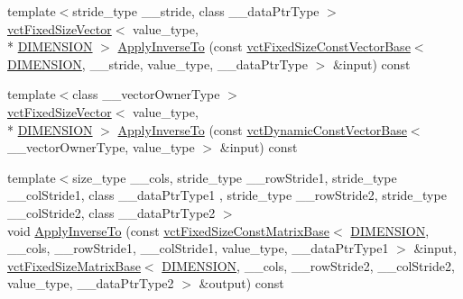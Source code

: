 \begin{DoxyCompactItemize}
\item 
{\footnotesize template$<$stride\-\_\-type \-\_\-\-\_\-stride, class \-\_\-\-\_\-data\-Ptr\-Type $>$ }\\\hyperlink{classvct_fixed_size_vector}{vct\-Fixed\-Size\-Vector}$<$ value\-\_\-type, \\*
\hyperlink{classvct_quaternion_rotation3_base_a729ac03acdd5949ecf382629e563d2a0a9417132a8a6849e18439d903ae6a1f18}{D\-I\-M\-E\-N\-S\-I\-O\-N} $>$ \hyperlink{classvct_quaternion_rotation3_base_a0b8f96ed4e769aab1d14769de116bf2b}{Apply\-Inverse\-To} (const \hyperlink{classvct_fixed_size_const_vector_base}{vct\-Fixed\-Size\-Const\-Vector\-Base}$<$ \hyperlink{classvct_quaternion_rotation3_base_a729ac03acdd5949ecf382629e563d2a0a9417132a8a6849e18439d903ae6a1f18}{D\-I\-M\-E\-N\-S\-I\-O\-N}, \-\_\-\-\_\-stride, value\-\_\-type, \-\_\-\-\_\-data\-Ptr\-Type $>$ \&input) const 
\item 
{\footnotesize template$<$class \-\_\-\-\_\-vector\-Owner\-Type $>$ }\\\hyperlink{classvct_fixed_size_vector}{vct\-Fixed\-Size\-Vector}$<$ value\-\_\-type, \\*
\hyperlink{classvct_quaternion_rotation3_base_a729ac03acdd5949ecf382629e563d2a0a9417132a8a6849e18439d903ae6a1f18}{D\-I\-M\-E\-N\-S\-I\-O\-N} $>$ \hyperlink{classvct_quaternion_rotation3_base_ae1df006c81b202fa7015879c8c91448a}{Apply\-Inverse\-To} (const \hyperlink{classvct_dynamic_const_vector_base}{vct\-Dynamic\-Const\-Vector\-Base}$<$ \-\_\-\-\_\-vector\-Owner\-Type, value\-\_\-type $>$ \&input) const 
\item 
{\footnotesize template$<$size\-\_\-type \-\_\-\-\_\-cols, stride\-\_\-type \-\_\-\-\_\-row\-Stride1, stride\-\_\-type \-\_\-\-\_\-col\-Stride1, class \-\_\-\-\_\-data\-Ptr\-Type1 , stride\-\_\-type \-\_\-\-\_\-row\-Stride2, stride\-\_\-type \-\_\-\-\_\-col\-Stride2, class \-\_\-\-\_\-data\-Ptr\-Type2 $>$ }\\void \hyperlink{classvct_quaternion_rotation3_base_a50ed1dcc4a0a0b748bb0f17b481e4584}{Apply\-Inverse\-To} (const \hyperlink{classvct_fixed_size_const_matrix_base}{vct\-Fixed\-Size\-Const\-Matrix\-Base}$<$ \hyperlink{classvct_quaternion_rotation3_base_a729ac03acdd5949ecf382629e563d2a0a9417132a8a6849e18439d903ae6a1f18}{D\-I\-M\-E\-N\-S\-I\-O\-N}, \-\_\-\-\_\-cols, \-\_\-\-\_\-row\-Stride1, \-\_\-\-\_\-col\-Stride1, value\-\_\-type, \-\_\-\-\_\-data\-Ptr\-Type1 $>$ \&input, \hyperlink{classvct_fixed_size_matrix_base}{vct\-Fixed\-Size\-Matrix\-Base}$<$ \hyperlink{classvct_quaternion_rotation3_base_a729ac03acdd5949ecf382629e563d2a0a9417132a8a6849e18439d903ae6a1f18}{D\-I\-M\-E\-N\-S\-I\-O\-N}, \-\_\-\-\_\-cols, \-\_\-\-\_\-row\-Stride2, \-\_\-\-\_\-col\-Stride2, value\-\_\-type, \-\_\-\-\_\-data\-Ptr\-Type2 $>$ \&output) const 

\end{DoxyCompactItemize}
